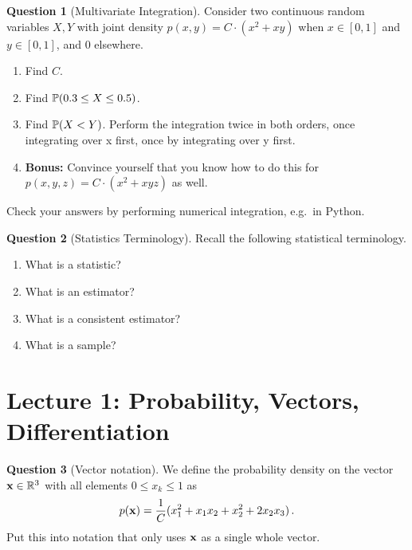 \documentclass[a4paper]{article}
\theoremstyle{definition}
\newtheorem{question}{Question}
\begin{document}
\begin{question}[Multivariate Integration]
\label{q:mi}
Consider two continuous random variables $X,Y$ with joint density $p(x, y) = C\cdot (x^2 + xy)$ when $x \in [0, 1]$ and $y \in [0, 1]$, and $0$ elsewhere.
\begin{enumerate}[label=\alph*.]
    \item Find $C$.
    \item Find $\prob{0.3 \leq X \leq 0.5}$.
    \item Find $\prob{X < Y}$. Perform the integration twice in both orders, once integrating over x first, once by integrating over y first.
    \item \textbf{Bonus:} Convince yourself that you know how to do this for $p(x, y, z) = C\cdot (x^2 + xyz)$ as well.
\end{enumerate}
Check your answers by performing numerical integration, e.g.~in Python.
\end{question}

\begin{question}[Statistics Terminology] Recall the following statistical terminology.
\label{q:stats-term}
\begin{enumerate}[label=\alph*.]
    \item What is a statistic?
    \item What is an estimator?
    \item What is a consistent estimator?
    \item What is a sample?
\end{enumerate}
\end{question}





\section{Lecture 1: Probability, Vectors, Differentiation}
\begin{question}[Vector notation]
We define the probability density on the vector $\mathbf{x} \in \mathbb{R}^3$ with all elements $0 \leq x_k \leq 1$ as
\begin{align}
p(\mathbf{x}) = \frac{1}{C} (x_1^2 + x_1x_2 + x_2^2 + 2x_2x_3) \,.
\end{align}
Put this into notation that only uses $\mathbf{x}$ as a single whole vector.
\end{question}
\end{document}

